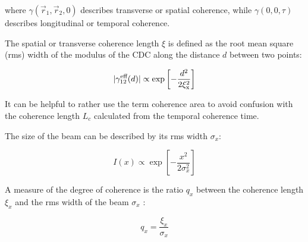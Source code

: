 \documentclass{osa-article}
\begin{document}
where $ \gamma(\vec{r}_1,\vec{r}_2,0) $ describes transverse or spatial coherence, while $ \gamma(0,0,\tau) $ describes longitudinal or temporal coherence.

The spatial or transverse coherence length $ \xi $ is defined as the root mean square (rms) width of the modulus of the CDC \cite[eq.5]{BagschikFroemterMuellerEtAl2016a} along the distance $d$ between two points:

\begin{equation}
    |\gamma_{12}^{\textup{eff}}(d)| \propto \exp{\left[-\frac{d^2}{2 \xi_\textup{x}^2}\right]}
    \label{eq:coherencelength}
\end{equation}

It can be helpful to rather use the term coherence area \cite[fig. 11.2]{Svelto2010} to avoid confusion with the coherence length $L_c$ calculated from the temporal coherence time.


The size of the beam can be described by its rms width $\sigma_x$:

\begin{equation}
    I(x) \propto \exp\!\left[-\frac{x^2}{2\sigma_x^2}\right]
    \label{eq:beam_rms_width}
\end{equation}

A measure of the degree of coherence is the ratio $ q_x $ between the coherence length $\xi_x$ and the rms width of the beam $\sigma_x $ \cite{MandelWolf1995-Opticalcoherencequantum}:

\begin{equation}
    q_x = \frac{\xi_x}{\sigma_x}
\end{equation}





\end{document}
